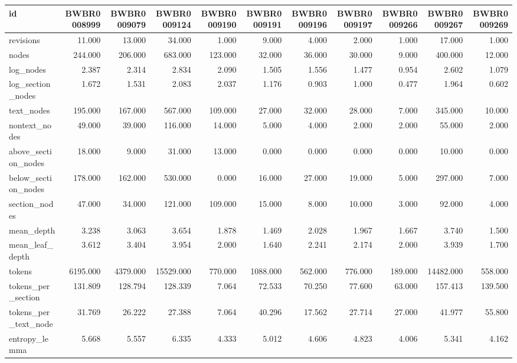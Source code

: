 \begin{tabular}{lrrrrrrrrrr}
\toprule
id & BWBR0008999 & BWBR0009079 & BWBR0009124 & BWBR0009190 & BWBR0009191 & BWBR0009196 & BWBR0009197 & BWBR0009266 & BWBR0009267 & BWBR0009269 \\
\midrule
revisions & 11.000 & 13.000 & 34.000 & 1.000 & 9.000 & 4.000 & 2.000 & 1.000 & 17.000 & 1.000 \\
\cline{1-11}
nodes & 244.000 & 206.000 & 683.000 & 123.000 & 32.000 & 36.000 & 30.000 & 9.000 & 400.000 & 12.000 \\
\cline{1-11}
log\_nodes & 2.387 & 2.314 & 2.834 & 2.090 & 1.505 & 1.556 & 1.477 & 0.954 & 2.602 & 1.079 \\
\cline{1-11}
log\_section\_nodes & 1.672 & 1.531 & 2.083 & 2.037 & 1.176 & 0.903 & 1.000 & 0.477 & 1.964 & 0.602 \\
\cline{1-11}
text\_nodes & 195.000 & 167.000 & 567.000 & 109.000 & 27.000 & 32.000 & 28.000 & 7.000 & 345.000 & 10.000 \\
\cline{1-11}
nontext\_nodes & 49.000 & 39.000 & 116.000 & 14.000 & 5.000 & 4.000 & 2.000 & 2.000 & 55.000 & 2.000 \\
\cline{1-11}
above\_section\_nodes & 18.000 & 9.000 & 31.000 & 13.000 & 0.000 & 0.000 & 0.000 & 0.000 & 10.000 & 0.000 \\
\cline{1-11}
below\_section\_nodes & 178.000 & 162.000 & 530.000 & 0.000 & 16.000 & 27.000 & 19.000 & 5.000 & 297.000 & 7.000 \\
\cline{1-11}
section\_nodes & 47.000 & 34.000 & 121.000 & 109.000 & 15.000 & 8.000 & 10.000 & 3.000 & 92.000 & 4.000 \\
\cline{1-11}
mean\_depth & 3.238 & 3.063 & 3.654 & 1.878 & 1.469 & 2.028 & 1.967 & 1.667 & 3.740 & 1.500 \\
\cline{1-11}
mean\_leaf\_depth & 3.612 & 3.404 & 3.954 & 2.000 & 1.640 & 2.241 & 2.174 & 2.000 & 3.939 & 1.700 \\
\cline{1-11}
tokens & 6195.000 & 4379.000 & 15529.000 & 770.000 & 1088.000 & 562.000 & 776.000 & 189.000 & 14482.000 & 558.000 \\
\cline{1-11}
tokens\_per\_section & 131.809 & 128.794 & 128.339 & 7.064 & 72.533 & 70.250 & 77.600 & 63.000 & 157.413 & 139.500 \\
\cline{1-11}
tokens\_per\_text\_node & 31.769 & 26.222 & 27.388 & 7.064 & 40.296 & 17.562 & 27.714 & 27.000 & 41.977 & 55.800 \\
\cline{1-11}
entropy\_lemma & 5.668 & 5.557 & 6.335 & 4.333 & 5.012 & 4.606 & 4.823 & 4.006 & 5.341 & 4.162 \\

\end{tabular}
